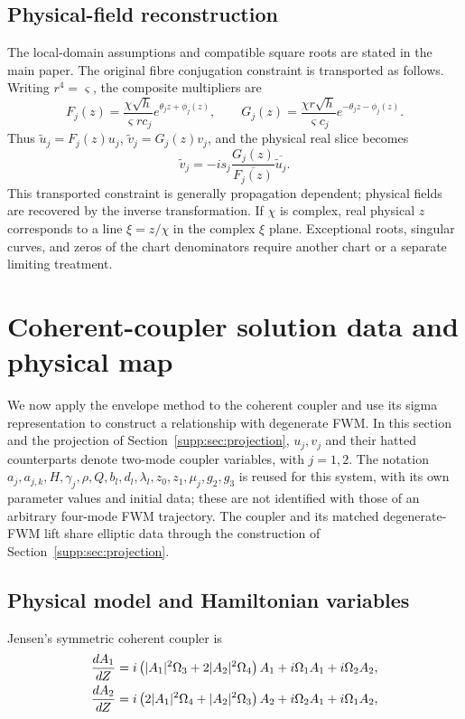 \documentclass[11pt,a4paper]{article}
\begin{document}
\subsection{Physical-field reconstruction}\label{subsec:transform-domain}
The local-domain assumptions and compatible square roots are stated in the main paper. The original fibre conjugation constraint is transported as follows.
Writing $r^4=\varsigma$, the composite multipliers are
\begin{equation}
F_j(z)=\frac{\chi\sqrt h}{\varsigma r c_j}e^{\theta_jz+\phi_j(z)},\qquad
G_j(z)=\frac{\chi r\sqrt h}{\varsigma c_j}e^{-\theta_jz-\phi_j(z)}.
\end{equation}
Thus $\tilde u_j=F_j(z)u_j$, $\tilde v_j=G_j(z)v_j$, and the physical real slice becomes
\begin{equation}
\tilde v_j=-is_j\frac{G_j(z)}{\overline{F_j(z)}}\overline{\tilde u_j}.
\end{equation}
This transported constraint is generally propagation dependent; physical fields are recovered by the inverse transformation.
If $\chi$ is complex, real physical $z$ corresponds to a line $\xi=z/\chi$ in the complex $\xi$ plane.
Exceptional roots, singular curves, and zeros of the chart denominators require another chart or a separate limiting treatment.

\section{Coherent-coupler solution data and physical map}\label{supp:sec:coupler}
We now apply the envelope method to the coherent coupler and use its sigma representation to construct a relationship with degenerate FWM.
In this section and the projection of Section~\ref{supp:sec:projection}, $u_j,v_j$ and their hatted counterparts denote two-mode coupler variables, with $j=1,2$.
The notation $a_j,a_{j,k},H,\gamma_j,\rho,Q,b_l,d_l,\lambda_l,z_0,z_1,\mu_j,g_2,g_3$ is reused for this system, with its own parameter values and initial data; these are not identified with those of an arbitrary four-mode FWM trajectory.
The coupler and its matched degenerate-FWM lift share elliptic data through the construction of Section~\ref{supp:sec:projection}.

\subsection{Physical model and Hamiltonian variables}
Jensen's symmetric coherent coupler is
\begin{align}
\frac{dA_1}{dZ} &= i \left(|A_1|^2 {\Omega}_{3} + 2 |A_2|^2 {\Omega}_{4}\right) A_1 + i {\Omega}_{1} A_1  + i {\Omega}_{2} A_2, \notag \\
\frac{dA_2}{dZ} &= i \left(2 |A_1|^2 {\Omega}_{4} + |A_2|^2 {\Omega}_{3}\right) A_2 + i {\Omega}_{2} A_1  + i {\Omega}_{1} A_2, \label{cc:eq:jensen}
\end{align}
\end{document}
